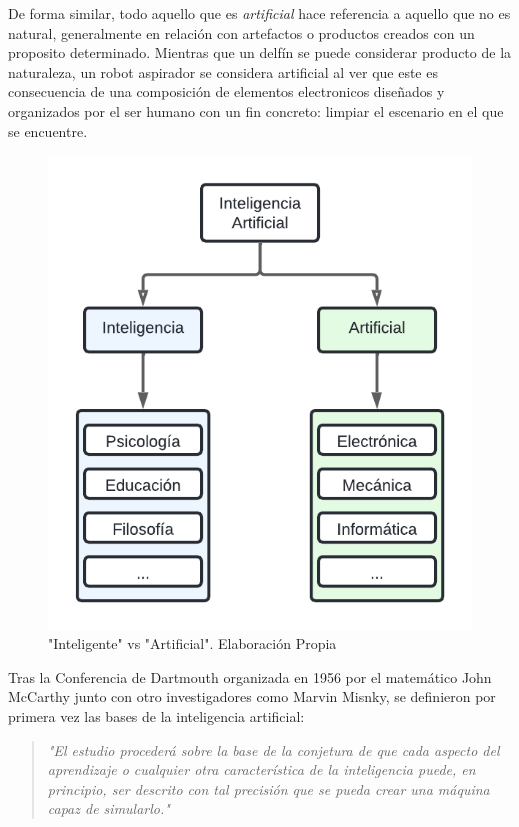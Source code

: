 De forma similar, todo aquello que es \emph{artificial} hace referencia a
aquello que no es natural, generalmente en relación con artefactos o productos
creados con un proposito determinado. Mientras que un delfín se puede considerar
producto de la naturaleza, un robot aspirador se considera artificial al ver que
este es consecuencia de una composición de elementos electronicos diseñados y
organizados por el ser humano con un fin concreto: limpiar el escenario en el
que se encuentre.

\begin{figure}[t]
    \centering
    \includegraphics[scale=0.8, trim=0.5cm 0.5cm 0.5cm 0.5cm]{figs/artificial-vs-intelligence.png}
    \caption{\small"Inteligente" vs "Artificial". Elaboración Propia}
    \label{fig:etiqueta}
\end{figure}

Tras la Conferencia de Dartmouth organizada en 1956 por el matemático John McCarthy
junto con otro investigadores como Marvin Misnky, se definieron por primera vez las
bases de la inteligencia artificial:

\begin{quote}
    \textit{
        "El estudio procederá sobre la base de la conjetura de que cada aspecto
        del aprendizaje o cualquier otra característica de la inteligencia
        puede, en principio, ser descrito con tal precisión que se pueda crear
        una máquina capaz de simularlo." \citet{mccarthy2006proposal}
    }
\end{quote}

